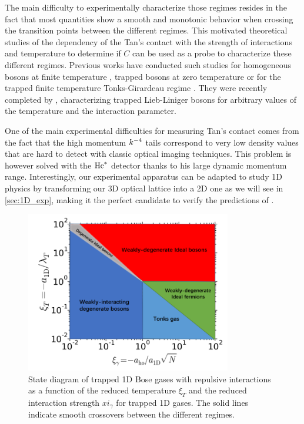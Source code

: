 The main difficulty to experimentally characterize those regimes resides in the fact that most quantities show a smooth and monotonic behavior when crossing the transition points between the different regimes. This motivated theoretical studies of the dependency of the Tan's contact with the strength of interactions and temperature to determine if $C$ can be used as a probe to characterize these different regimes. Previous works have conducted such studies for homogeneous bosons at finite temperature \cite{kheruntsyan2003pair,kormos2009expectation}, trapped bosons at zero temperature \cite{minguzzi2002high,olshanii2003short} or for the trapped finite temperature Tonks-Girardeau regime \cite{vignolo2013universal}. They were recently completed by \cite{yao2018tan}, characterizing trapped Lieb-Liniger bosons for arbitrary values of the temperature and the interaction parameter.

One of the main experimental difficulties for measuring Tan's contact comes from the fact that the high momentum $k^{-4}$ tails correspond to very low density values that are hard to detect with classic optical imaging techniques. This problem is however solved with the $\mathrm{He}^*$ detector thanks to his large dynamic momentum range. Interestingly, our experimental apparatus can be adapted to study 1D physics by transforming our 3D optical lattice into a 2D one as we will see in \ref{sec:1D_exp}, making it the perfect candidate to verify the predictions of \cite{yao2018tan}.

\begin{figure}
    \centering
    \includegraphics[width=0.8\textwidth]{Fig/Chapter5/state_diagam_hepeng.png}
    \caption{State diagram of trapped 1D Bose gases with repulsive interactions as a function of the reduced temperature $\xi_T$ and the reduced interaction strength $xi_{\gamma}$ for trapped 1D gases. The solid lines indicate smooth crossovers between the different regimes.}
    \label{fig:1D_diagram}
\end{figure}


